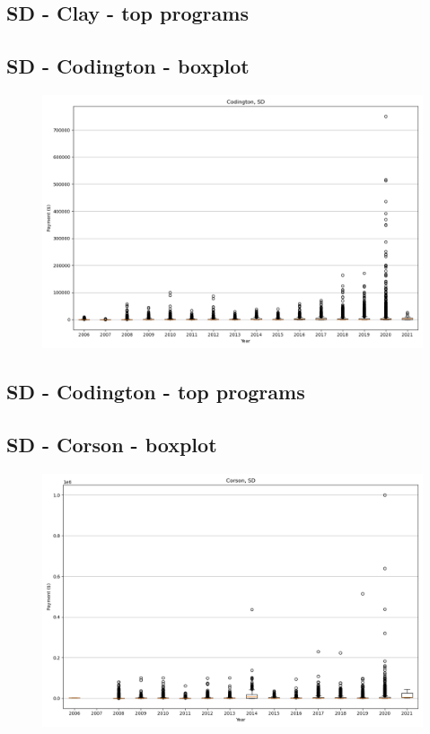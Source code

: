 \subsection*{SD - Clay - top programs}

\newpage
\subsection*{SD - Codington - boxplot}
\begin{figure}[h]
\centering
\includegraphics[width=7in]{../output/boxplots/counties/Codington-SD_boxplot.png}
\end{figure}


\subsection*{SD - Codington - top programs}

\newpage
\subsection*{SD - Corson - boxplot}
\begin{figure}[h]
\centering
\includegraphics[width=7in]{../output/boxplots/counties/Corson-SD_boxplot.png}
\end{figure}


